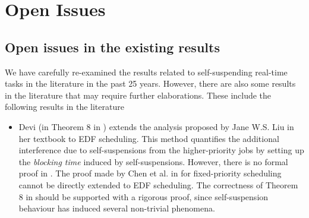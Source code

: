\section{Open Issues}
\label{sec:open-issues}

\subsection{Open issues in the existing results}
\label{sec:open-issues-existing} 
We have carefully re-examined the results related to self-suspending
real-time tasks in the literature in the past 25 years. However, there
are also some results in the literature that may require further
elaborations. These include the following results in the literature
\begin{itemize}
\item Devi (in Theorem 8 in \cite[Section
  4.5]{DBLP:conf/ecrts/Devi03}) extends the analysis proposed by Jane
  W.S. Liu in her textbook \cite[Page 164-165]{Liu:2000:RS:518501} to
  EDF scheduling. This method quantifies the additional interference
  due to self-suspensions from the higher-priority jobs by setting up
  the \emph{blocking time} induced by self-suspensions. However, there
  is no formal proof in \cite{DBLP:conf/ecrts/Devi03}. The proof made
  by Chen et al. in \cite{ChenHuangNelissen} for fixed-priority
  scheduling cannot be directly extended to EDF scheduling. The
  correctness of Theorem 8 in \cite[Section
  4.5]{DBLP:conf/ecrts/Devi03} should be supported with a rigorous
  proof, since self-suspension behaviour has induced several
  non-trivial phenomena.


\end{itemize}
